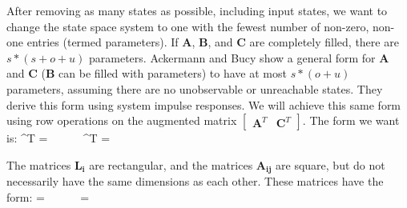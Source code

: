    After removing as many states as possible, including input
states, we want to change the state space system to one with the
fewest number of non-zero, non-one entries (termed parameters). If
$\mathbf{A}$, $\mathbf{B}$, and $\mathbf{C}$ are completely
filled, there are $s*(s+o+u)$ parameters. Ackermann and Bucy
\cite{Ackermann/Bucy} show a general form for $\mathbf{A}$ and
$\mathbf{C}$ ($\mathbf{B}$ can be filled with parameters) to have
at most $s*(o+u)$ parameters, assuming there are no unobservable
or unreachable states. They derive this form using system impulse
responses. We will achieve this same form using row operations on
the augmented matrix $\left [
\begin{array} {cc} \mathbf{A}^T & \mathbf{C}^T \end{array} \right
]$. The form we want is:
\starteqnstar
{}^T =  ~~~~~
^T = 
\doneeqnstar

    The matrices $\mathbf{L_i}$ are rectangular, and the matrices
$\mathbf{A_{ij}}$ are square, but do not necessarily have the same
dimensions as each other. These matrices have the form:
\starteqnstar
{} =  ~~~~~
 = 
\doneeqnstar

